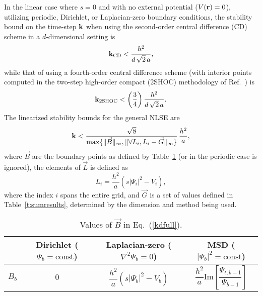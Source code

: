\documentclass{article}
\begin{document}
In the linear case where $s=0$ and with no external potential ($V({\bf r})=0$), utilizing periodic, Dirichlet, or Laplacian-zero boundary conditions, the stability bound on the time-step ${\bf k}$ when using the second-order central difference (CD) scheme in a $d$-dimensional setting is 
\begin{equation}
\label{kdcdlin}
{\bf k_{\mbox{\scriptsize CD}}} < \frac{h^2}{d\,\sqrt{2}\, a},
\end{equation}
while that of using a fourth-order central difference scheme (with interior points computed in the two-step high-order compact (2SHOC) methodology of Ref.~\cite{ME_2SHOC}) is
\begin{equation}
\label{kd2shoclin}
{\bf k_{\mbox{\scriptsize 2SHOC}}} < \left(\frac{3}{4}\right) \frac{h^2}{d\,\sqrt{2}\, a}.
\end{equation}
The linearized stability bounds for the general NLSE are
\begin{equation}
\label{kdfull}
{\bf k} < \frac{\sqrt{8}}{\max\{\lVert\vec B\rVert_{\infty},\Vert \forall L_i, L_i-\vec G\rVert_{\infty}\}}\,\frac{h^2}{a},
\end{equation}
where $\vec B$ are the boundary points as defined by Table~\ref{t:bc2} (or in the periodic case is ignored), the elements of $\vec L$ is defined as
\[
L_i = \frac{h^2}{a}\left(s|\Psi_i|^2 - V_i\right),
\]
where the index $i$ spans the entire grid, and $\vec G$ is a set of values defined in Table~\ref{t:sumresults}, determined by the dimension and method being used.
\begin{table}[htbp] 
\caption{Values of $\vec B$ in Eq.~(\ref{kdfull}).}
\begin{center}
\begin{tabular}{|l|c|c|c|} \hline
$\;$  & Dirichlet ($\Psi_b = \mbox{const}$) & Laplacian-zero ($\nabla^2\Psi_b = 0$)        & MSD ($|\Psi_b|^2 = \mbox{const}$) \\ \hline
$B_b$ & $0$       & $\dfrac{h^2}{a}\left(s|\Psi_b|^2-V_b\right)$ & $\dfrac{h^2}{a}\mbox{Im}\left[\dfrac{\Psi_{t,b-1}}{\Psi_{b-1}}\right]$ \\ \hline
\end{tabular}
\end{center}
\label{t:bc2}
\end{table}
\end{document}
